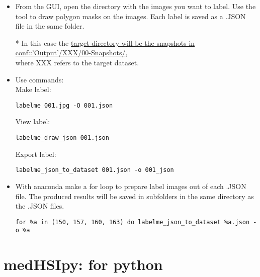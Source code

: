 \documentclass{foxelas_report}
\begin{document}
\begin{enumerate}
\begin{itemize}
\item From the GUI, open the directory with the images you want to label. Use the tool to draw polygon masks on the images. Each label is saved as a .JSON file in the same folder. 

* In this case the \underline{target directory will be the snapshots in}\\
\underline{conf::'Output'/XXX/00-Snapshots/},\\ where XXX refers to the target dataset.

\item Use commands: \\
Make label: 
\begin{lstlisting}
labelme 001.jpg -O 001.json 
\end{lstlisting}

View label: 
\begin{lstlisting}
labelme_draw_json 001.json
\end{lstlisting}

Export label:
\begin{lstlisting}
labelme_json_to_dataset 001.json -o 001_json
\end{lstlisting}


\item With anaconda make a for loop to prepare label images out of each .JSON file. The produced results will be saved in subfolders in the same directory as the .JSON files. 

\begin{lstlisting}
for %a in (150, 157, 160, 163) do labelme_json_to_dataset %a.json -o %a
\end{lstlisting}



\end{itemize}

\end{enumerate}

\section{medHSIpy: for python}


\end{document}
